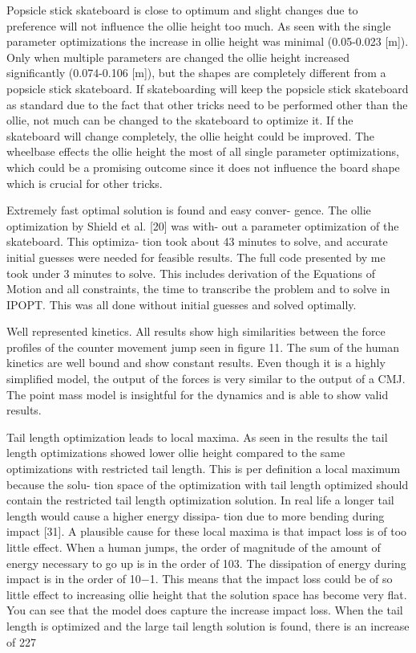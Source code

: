 \documentclass[default,iicol]{sn-jnl}
\begin{document}
Popsicle stick skateboard is close to optimum and slight changes due to preference will not influence the ollie height too much. As seen with the single parameter optimizations the increase in ollie height was minimal (0.05-0.023 [m]). Only when multiple parameters are changed the ollie height increased significantly (0.074-0.106 [m]), but the shapes are completely different from a popsicle stick skateboard. If skateboarding will keep the popsicle stick skateboard as standard due to the fact that other tricks need to be performed other than the ollie, not much can be changed to the skateboard to optimize it. If the skateboard will change completely, the ollie height could be improved. The wheelbase effects the ollie height the most of all single parameter optimizations, which could be a promising outcome since it does not influence the board shape which is crucial for other tricks.

Extremely fast optimal solution is found and easy conver- gence. The ollie optimization by Shield et al. [20] was with- out a parameter optimization of the skateboard. This optimiza- tion took about 43 minutes to solve, and accurate initial guesses were needed for feasible results. The full code presented by me took under 3 minutes to solve. This includes derivation of the Equations of Motion and all constraints, the time to transcribe the problem and to solve in IPOPT. This was all done without initial guesses and solved optimally.

Well represented kinetics. All results show high similarities between the force profiles of the counter movement jump seen in figure 11. The sum of the human kinetics are well bound and show constant results. Even though it is a highly simplified model, the output of the forces is very similar to the output of a CMJ. The point mass model is insightful for the dynamics and is able to show valid results.

Tail length optimization leads to local maxima. As seen in the results the tail length optimizations showed lower ollie height compared to the same optimizations with restricted tail length. This is per definition a local maximum because the solu- tion space of the optimization with tail length optimized should contain the restricted tail length optimization solution. In real life a longer tail length would cause a higher energy dissipa- tion due to more bending during impact [31]. A plausible cause for these local maxima is that impact loss is of too little effect. When a human jumps, the order of magnitude of the amount of energy necessary to go up is in the order of 103. The dissipation of energy during impact is in the order of 10−1. This means that the impact loss could be of so little effect to increasing ollie height that the solution space has become very flat. You can see that the model does capture the increase impact loss. When the tail length is optimized and the large tail length solution is found, there is an increase of 227
\end{document}
